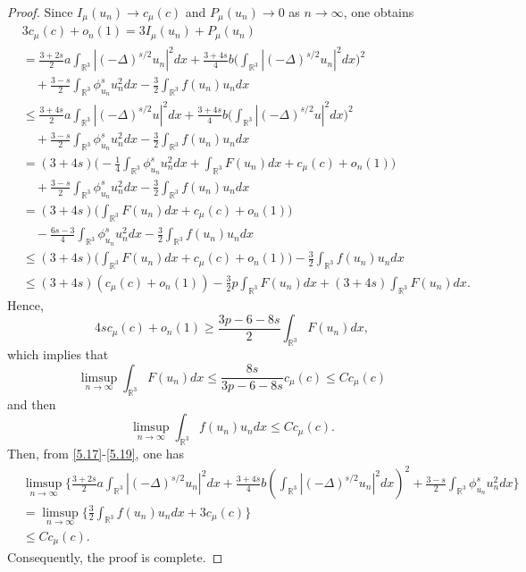 \begin{proof} 
Since $I_\mu(u_n)\to c_\mu(c)$ and $P_\mu(u_n)\to 0$ as $n \to \infty$, one obtains
\begin{equation}\label{5.17}
\begin{split}
&3c_\mu(c)+o_n {(1)}=3I_\mu(u_n)+P_\mu(u_n)\\
&= \frac{3+2s}{2}a\int_{\mathbb{R}^3}|(-\Delta)^{s/2}u_n|^2dx
+\frac{3+4s}{4}b\Big(\int_{\mathbb{R}^3}|(-\Delta)^{s/2}u_n|^2dx\Big)^2\\
&\quad +\frac{3-s}{2}\int_{\mathbb{R}^3}\phi^s_{u_n} u^2_ndx
 -\frac{3}{2}\int_{\mathbb{R}^3}f(u_n)u_ndx\\
&\leq  \frac{3+4s}{2}a\int_{\mathbb{R}^3}|(-\Delta)^{s/2}u|^2dx
+\frac{3+4s}{4}b\Big(\int_{\mathbb{R}^3}|(-\Delta)^{s/2}u|^2dx\Big)^2\\
&\quad +\frac{3-s}{2}\int_{\mathbb{R}^3}\phi^s_{u_n} u^2_ndx-\frac{3}{2}\int_{\mathbb{R}^3}f(u_n)u_ndx\\
&= (3+4s)\Big(-\frac{1}{4}\int_{\mathbb{R}^3}\phi^s_{u_n} u^2_ndx
 +\int_{\mathbb{R}^3}F(u_n)dx+c_\mu(c)+o_n(1)\Big)\\
&\quad +\frac{3-s}{2}\int_{\mathbb{R}^3}\phi^s_{u_n} u^2_ndx
 -\frac{3}{2}\int_{\mathbb{R}^3}f(u_n)u_ndx\\
&= (3+4s)\Big(\int_{\mathbb{R}^3}F(u_n)dx+c_\mu(c)+o_n(1)\Big)\\
&\quad -\frac{6s-3}{4}\int_{\mathbb{R}^3}\phi^s_{u_n} u^2_ndx-\frac{3}{2}\int_{\mathbb{R}^3}f(u_n)u_ndx\\
&\leq  (3+4s)\Big(\int_{\mathbb{R}^3}F(u_n)dx+c_\mu(c)+o_n(1)\Big)
 -\frac{3}{2}\int_{\mathbb{R}^3}f(u_n)u_ndx\\
&\leq  (3+4s)(c_\mu(c)+o_n(1))-\frac{3}{2}p\int_{\mathbb{R}^3}F(u_n)dx
 +(3+4s)\int_{\mathbb{R}^3}F(u_n)dx.
\end{split}
\end{equation}
Hence,
$$
4sc_\mu(c)+o_n(1)\geq \frac{3p-6-8s}{2}\int_{\mathbb{R}^3}F(u_n)dx,
$$
which implies that
\begin{equation}\label{5.18}
\limsup_{n\to \infty} \int_{\mathbb{R}^3}F(u_n)dx
\leq \frac{8s}{3p-6-8s}c_\mu(c) 
\leq C c_\mu(c)
\end{equation}
and then
\begin{equation}\label{5.19}
\limsup_{n\to \infty} \int_{\mathbb{R}^3}f(u_n)u_ndx \leq C c_\mu(c).
\end{equation}
Then, from \eqref{5.17}-\eqref{5.19}, one has
\begin{align*} %
&\limsup_{n\to \infty}\Big\{\frac{3+2s}{2}a
 \int_{\mathbb{R}^3}|(-\Delta)^{s/2}u_n|^2dx
 +\frac{3+4s}{4}b(\int_{\mathbb{R}^3}|(-\Delta)^{s/2}u_n|^2dx)^2
 +\frac{3-s}{2}\int_{\mathbb{R}^3}\phi^s_{u_n} u^2_ndx\Big\}\\
&= \limsup_{n\to \infty}\Big\{\frac{3}{2}\int_{\mathbb{R}^3}f(u_n)u_ndx+3c_\mu(c)\Big\}\\
&\leq  C c_\mu(c).
\end{align*}
Consequently, the proof is complete.
\end{proof}

